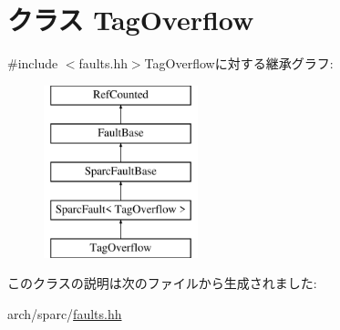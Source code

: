 \hypertarget{classSparcISA_1_1TagOverflow}{
\section{クラス TagOverflow}
\label{classSparcISA_1_1TagOverflow}
}


{\ttfamily \#include $<$faults.hh$>$}TagOverflowに対する継承グラフ:\begin{figure}[H]
\begin{center}
\leavevmode
\includegraphics[height=5cm]{classSparcISA_1_1TagOverflow}
\end{center}
\end{figure}


このクラスの説明は次のファイルから生成されました:\begin{DoxyCompactItemize}
\item 
arch/sparc/\hyperlink{arch_2sparc_2faults_8hh}{faults.hh}\end{DoxyCompactItemize}
